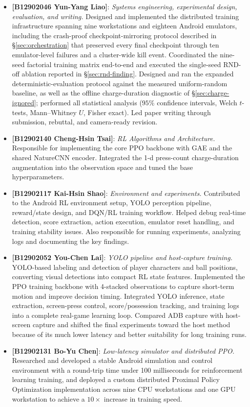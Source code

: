 \documentclass{article}
\begin{document}
\begin{itemize}
  \item \textbf{[B12902046 Yun-Yang Liao]}: \emph{Systems
    engineering, experimental design, evaluation, and writing.}
    Designed and implemented the distributed training
    infrastructure spanning nine workstations and eighteen Android
    emulators, including the crash-proof checkpoint-mirroring
    protocol described in \S\ref{sec:orchestration} that preserved
    every final checkpoint through ten emulator-level failures and
    a cluster-wide kill event. Coordinated the nine-seed factorial
    training matrix end-to-end and executed the single-seed
    RND-off ablation reported in \S\ref{sec:rnd-finding}.
    Designed and ran the expanded deterministic-evaluation
    protocol against the measured uniform-random baseline, as
    well as the offline charge-duration diagnostic of
    \S\ref{sec:charge-ignored}; performed all statistical analysis
    ($95\%$ confidence intervals, Welch $t$-tests, Mann--Whitney
    $U$, Fisher exact). Led paper writing through submission,
    rebuttal, and camera-ready revision.
  \item \textbf{[B12902140 Cheng-Hsin Tsai]}: \emph{RL Algorithms and Architecture.}
    Responsible for implementing the core PPO backbone with GAE and
    the shared NatureCNN encoder. Integrated the 1-d press-count
    charge-duration augmentation into the observation space and
    tuned the base hyperparameters.
  \item \textbf{[B12902117 Kai-Hsin Shao]}: \emph{Environment and experiments.}
    Contributed to the Android RL environment setup, YOLO perception
    pipeline, reward/state design, and DQN/RL training workflow.
    Helped debug real-time detection, score extraction, action
    execution, emulator reset handling, and training stability
    issues. Also responsible for running experiments, analyzing logs
    and documenting the key findings.
  \item \textbf{[B12902052 You-Chen Lai]}: \emph{YOLO pipeline and host-capture training.}
    YOLO-based labeling and detection of player characters and ball
    positions, converting visual detections into compact RL state
    features. Implemented the PPO training backbone with 4-stacked
    observations to capture short-term motion and improve decision
    timing. Integrated YOLO inference, state extraction, screen-press
    control, score/possession tracking, and training logs into a
    complete real-game learning loop. Compared ADB capture with
    host-screen capture and shifted the final experiments toward the
    host method because of its much lower latency and better
    suitability for long training runs.
  \item \textbf{[B12902131 Bo-Yu Chen]}: \emph{Low-latency simulator and distributed PPO.}
    Researched and developed a stable Android simulation and control
    environment with a round-trip time under 100 milliseconds for
    reinforcement learning training, and deployed a custom
    distributed Proximal Policy Optimization implementation across
    nine CPU workstations and one GPU workstation to achieve a
    $10\times$ increase in training speed.
\end{itemize}
\end{document}
